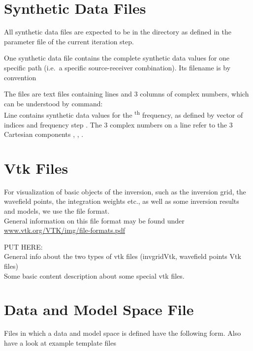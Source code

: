 \section{Synthetic Data Files} \label{files,sec:synth_data}
%
All synthetic data files are expected to be in the directory  as defined 
in the parameter file of the current iteration step.

One synthetic data file contains the complete synthetic data values for one specific path (i.e.\ a specific
source-receiver combination). Its filename is by convention 

The files are text files containing  lines and $3$ columns of 
complex numbers, which can be understood by   command:\\
Line  contains synthetic data values for the \textsuperscript{th} frequency, as defined by vector
of indices  and frequency step .
The $3$ complex numbers on a line refer to the $3$ Cartesian components , , .
%
\section{Vtk Files} \label{files,sec:vtk_files}
%
For visualization of basic objects of the inversion, such as the inversion grid, 
the wavefield points, the integration weights etc., as well as some inversion results
and models, we use the  file format.\\
General information on this file format may be found under \url{www.vtk.org/VTK/img/file-formats.pdf}

PUT HERE:\\
General info about the two types of vtk files (invgridVtk, wavefield points Vtk files)\\
Some basic content description about some special vtk files.
%
\section{Data and Model Space File} \label{files,sec:dmspace}
%
Files in which a data and model space is defined have the following form. Also have a look at 
example template files 

